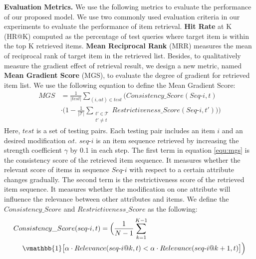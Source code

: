 \textbf{Evaluation Metrics.}
We use the following metrics to evaluate the performance of our proposed model. We use two commonly used evaluation criteria in our experiments to evaluate the performance of item retrieval. \textbf{Hit Rate} at K (HR@K) computed as the percentage of test queries where target item is within the top K retrieved items. \textbf{Mean Reciprocal Rank} (MRR) measures the mean of reciprocal rank of target item in the retrieved list. Besides, to qualitatively measure the gradient effect of retrieval result, we design a new metric, named \textbf{Mean Gradient Score} (MGS), to evaluate the degree of gradient for retrieved item list. We use the following equation to define the Mean Gradient Score:
\begin{equation}
\begin{aligned}
MGS & = \frac{1}{|\textit{test}|} \sum_{({i}, \alpha {t}) \in \textit{test}} \Big( Consistency\_Score(Seq\text{-}{{i}}, {t}) \\
 & \cdot \big( 1 - \frac{1}{|\mathcal{T}|} \sum_{\substack{{t}' \in \mathcal{T} \\ {t}' \neq {t}}} Restrictiveness\_Score( Seq\text{-}{i} , {t}') \big)\Big)
\end{aligned}
\label{equ:mgs}
\end{equation}
Here, $test$ is a set of testing pairs. Each testing pair includes an item ${i}$ and an desired modification $\alpha {t}$. $seq\text{-}{i}$ is an item sequence retrieved by increasing the strength coefficient $\gamma$ by 0.1 in each step. The first term in equation \ref{equ:mgs} is the consistency score of the retrieved item sequence. It measures whether the relevant score of items in sequence $Seq\text{-}{i}$ with respect to a certain attribute changes gradually. The second term is the restrictiveness score of the retrieved item sequence. It measures whether the modification on one attribute will influence the relevance between other attributes and items. 
We define the $Consistency\_Score$ and $Restrictiveness\_Score$ as the following:
\begin{equation}
\begin{aligned}
Co&nsistency\_Score(seq\text{-}i,t) = \Big(\frac{1}{N-1}\sum_{k=1}^{K-1} \\ &\vmathbb{1}\big[ \alpha \cdot Relevance(seq\text{-}{i}@k, {t}) < \alpha  \cdot Relevance(seq\text{-}{i}@k+1, {t})\big] \Big)
\end{aligned}
\label{equ:mgs_c}
\end{equation}
